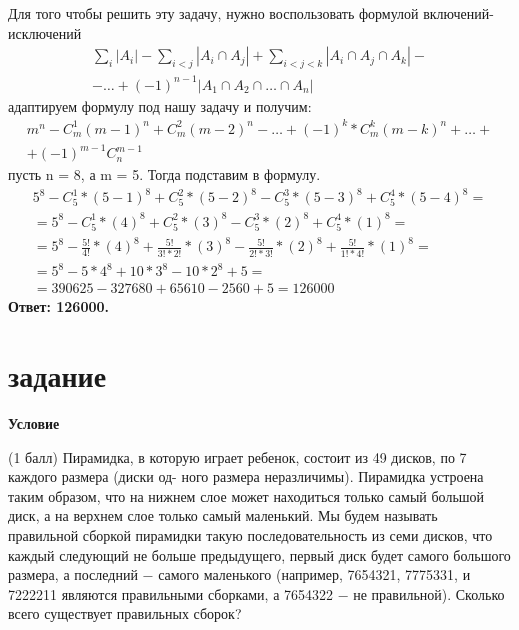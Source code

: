 \documentclass[a4paper]{article}
\begin{document}
\begin{center}
\begin{flushleft}
    Для того чтобы решить эту задачу, нужно воспользовать формулой включений-исключений \begin{gather*} \sum_{i} | A_i | - \sum_{i<j} | A_i \cap A_j | + \sum_{i<j<k} | A_i \cap A_j \cap A_k | - \\ - \ldots + (-1)^{n-1} | A_1 \cap A_2 \cap \ldots \cap A_n | \end{gather*}
    адаптируем формулу под нашу задачу и получим:
    \begin{gather*} m^{n} - C_m^1(m - 1)^{n}+C_m^2(m - 2)^{n}-\ldots+
    (-1)^{k}*C_m^k(m - k)^{n}+\ldots+ \\ +(-1)^{m-1}C_n^{m - 1} \end{gather*}
    пусть n = 8, а m = 5. Тогда подставим в формулу.
    \begin{gather*} 5^8 - C_5^1*(5-1)^8+C_5^2*(5-2)^8 -C_5^3*(5-3)^8+C_5^4*(5-4)^8= \\ =5^8 - C_5^1*(4)^8+C_5^2*(3)^8-C_5^3*(2)^8+C_5^4*(1)^8=\\=5^8 - \frac{5!}{4!}*(4)^8+\frac{5!}{3!*2!}*(3)^8-\frac{5!}{2!*3!}*(2)^8+\frac{5!}{1!*4!}*(1)^8=\\=5^8 - 5*4^8+10*3^8-10*2^8+5=\\= 390625 - 327680 + 65610 - 2560 + 5 =126000  \end{gather*}
    \textbf{Ответ: 126000.}
\end{flushleft}

\newpage

\section{задание}

\begin{flushleft}
    \textbf{{\Large Условие}}
\end{flushleft}
\begin{flushleft}
(1 балл) Пирамидка, в которую играет ребенок, состоит из 49 дисков, по 7 каждого размера (диски од- ного размера неразличимы). Пирамидка устроена таким образом, что на нижнем слое может находиться только самый большой диск, а на верхнем слое только самый маленький. Мы будем называть правильной сборкой пирамидки такую последовательность из семи дисков, что каждый следующий не больше предыдущего, первый диск будет самого большого размера, а последний − самого маленького (например, 7654321, 7775331, и 7222211 являются правильными сборками, а 7654322 − не правильной). Сколько всего существует правильных сборок?
\end{flushleft}
\hfill \break


\end{center}
\end{document}
